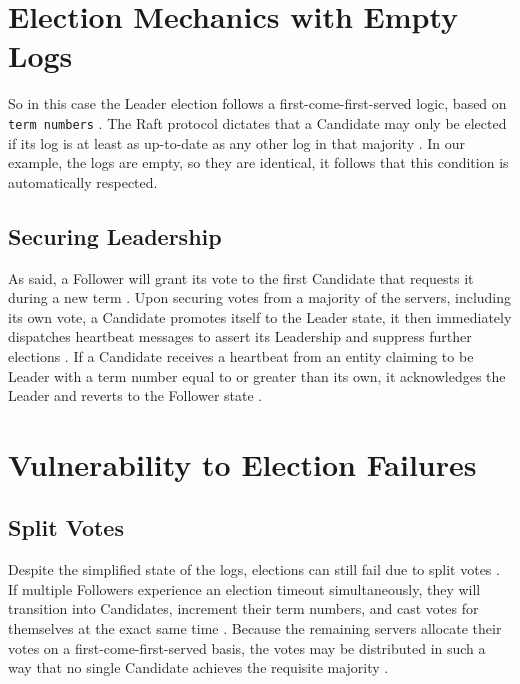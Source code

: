 \documentclass[a4paper,11pt]{article}
\begin{document}
\section{Election Mechanics with Empty Logs}
So in this case the Leader election follows a first-come-first-served logic,
based on \texttt{term numbers} \cite{tanenbaum2007distributed}.
The Raft protocol dictates that a Candidate may only be elected if its log
is at least as up-to-date as any other log in that majority \cite{184040}.
In our example, the logs are empty, so they are identical, it follows that this condition is
automatically respected.

\subsection{Securing Leadership}
As said, a Follower will grant its vote to the first Candidate that requests it
during a new term \cite{tanenbaum2007distributed}.
Upon securing votes from a majority of the servers, including its own vote, a
Candidate promotes itself to the Leader state, it then immediately dispatches heartbeat 
messages to assert its Leadership and suppress further elections \cite{tanenbaum2007distributed}.
If a Candidate receives a heartbeat from an entity claiming to be Leader with a
term number equal to or greater than its own, it acknowledges the Leader and reverts
to the Follower state \cite{tanenbaum2007distributed}.

\section{Vulnerability to Election Failures}
\subsection{Split Votes}
Despite the simplified state of the logs, elections can still fail due to split votes \cite{tanenbaum2007distributed}.
If multiple Followers experience an election timeout simultaneously, they will transition
into Candidates, increment their term numbers, and cast votes for themselves at the
exact same time \cite{tanenbaum2007distributed}.
Because the remaining servers allocate their votes on a first-come-first-served basis,
the votes may be distributed in such a way that no single Candidate achieves
the requisite majority \cite{tanenbaum2007distributed}.
\end{document}
